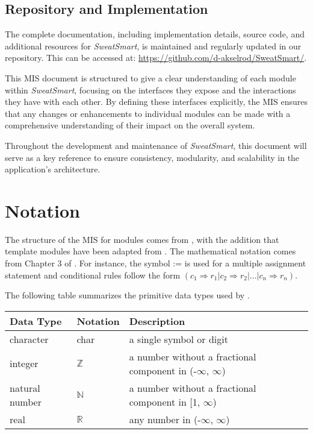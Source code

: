 \documentclass[12pt, titlepage]{article}
\begin{document}
\subsection{Repository and Implementation}
The complete documentation, including implementation details, source code, and additional resources for \textit{SweatSmart}, is maintained and regularly updated in our repository. This can be accessed at: \url{https://github.com/d-akselrod/SweatSmart/}.

This MIS document is structured to give a clear understanding of each module within \textit{SweatSmart}, focusing on the interfaces they expose and the interactions they have with each other. By defining these interfaces explicitly, the MIS ensures that any changes or enhancements to individual modules can be made with a comprehensive understanding of their impact on the overall system.

Throughout the development and maintenance of \textit{SweatSmart}, this document will serve as a key reference to ensure consistency, modularity, and scalability in the application's architecture.


\section{Notation}


The structure of the MIS for modules comes from \citet{HoffmanAndStrooper1995},
with the addition that template modules have been adapted from
\cite{GhezziEtAl2003}.  The mathematical notation comes from Chapter 3 of
\citet{HoffmanAndStrooper1995}.  For instance, the symbol := is used for a
multiple assignment statement and conditional rules follow the form $(c_1
\Rightarrow r_1 | c_2 \Rightarrow r_2 | ... | c_n \Rightarrow r_n )$.

The following table summarizes the primitive data types used by \progname. 

\begin{center}
\renewcommand{\arraystretch}{1.2}
\noindent 
\begin{tabular}{l l p{7.5cm}} 
\toprule 
\textbf{Data Type} & \textbf{Notation} & \textbf{Description}\\ 
\midrule
character & char & a single symbol or digit\\
integer & $\mathbb{Z}$ & a number without a fractional component in (-$\infty$, $\infty$) \\
natural number & $\mathbb{N}$ & a number without a fractional component in [1, $\infty$) \\
real & $\mathbb{R}$ & any number in (-$\infty$, $\infty$)\\
\bottomrule
\end{tabular} 
\end{center}
\end{document}
